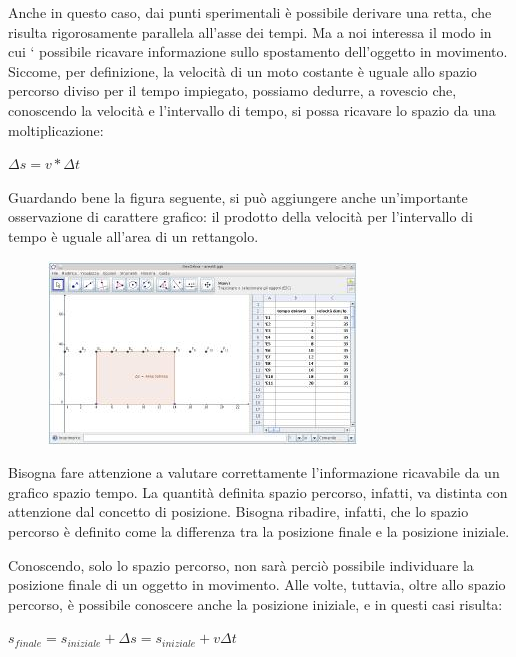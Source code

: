 Anche in questo caso, dai punti sperimentali è possibile derivare una retta, che risulta rigorosamente parallela all’asse dei tempi. Ma a noi interessa il modo in cui ` possibile ricavare informazione sullo spostamento dell’oggetto in movimento. Siccome, per definizione, la velocità di un moto costante è uguale allo spazio percorso diviso per il tempo impiegato, possiamo dedurre, a rovescio che, conoscendo la velocità e l’intervallo di tempo, si possa ricavare lo spazio da una moltiplicazione:
\begin{center}
\begin{math}
\Delta s = v * \Delta t 
\end{math}
\end{center}

Guardando bene la figura seguente, si può aggiungere anche un’importante osservazione di carattere grafico: il prodotto della velocità per l’intervallo di tempo è uguale all’area di un rettangolo.
\begin{figure}[H]
 \centering
 \includegraphics[width=.7\textwidth]{../immagini/spazioSottoIlGrafico_v-t.jpeg}
\end{figure}

Bisogna fare attenzione a valutare correttamente l’informazione ricavabile da un grafico spazio tempo. La quantità definita spazio percorso, infatti, va distinta con attenzione dal concetto di posizione. Bisogna ribadire, infatti, che lo spazio percorso è definito come la differenza tra la posizione finale e la posizione iniziale.

Conoscendo, solo lo spazio percorso, non sarà perciò possibile individuare la posizione finale di un oggetto in movimento.
Alle volte, tuttavia, oltre allo spazio percorso, è possibile conoscere anche la posizione iniziale, e in questi casi risulta:
\begin{center}
\begin{math}
s_{finale} = s_{iniziale} + \Delta s = s_{iniziale} + v \Delta t
\end{math}
\end{center}
